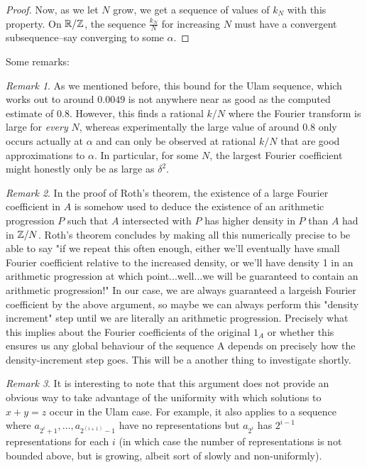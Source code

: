 \documentclass{article}
\theoremstyle{definition}
\theoremstyle{remark}
\newtheorem{remark}{Remark}
\numberwithin{equation}{section}
\begin{document}
\begin{proof}
Now, as we let $N$ grow, we get a sequence of values of $k_N$ with
this property.  On $\mathbb{R}/\mathbb{Z}$, the sequence $\frac{k_N}{N}$ for
increasing $N$ must have a convergent subsequence--say converging to
some $\alpha$.  
\end{proof}

Some remarks: 

\begin{remark}
  As we mentioned before, this bound for the Ulam sequence, which
  works out to around $0.0049$ is not anywhere near as good as the
  computed estimate of $0.8$.  However, this finds a rational $k/N$
  where the Fourier transform is large for \textit{every} $N$, whereas
  experimentally the large value of around $0.8$ only occurs actually
  at $\alpha$ and can only be observed at rational $k/N$ that are good
  approximations to $\alpha$.  In particular, for some $N$, the
  largest Fourier coefficient might honestly only be as large as
  $\delta^2$.
\end{remark}

\begin{remark}
  In the proof of Roth's theorem, the existence of a large Fourier
  coefficient in $A$ is somehow used to deduce the existence of an
  arithmetic progression $P$ such that $A$ intersected with $P$ has
  higher density in $P$ than $A$ had in $\mathbb{Z}/N$.  Roth's theorem
  concludes by making all this numerically precise to be able to say
  "if we repeat this often enough, either we'll eventually have small
  Fourier coefficient relative to the increased density, or we'll have
  density 1 in an arithmetic progression at which point...well...we
  will be guaranteed to contain an arithmetic progression!"  In our
  case, we are always guaranteed a largeish Fourier coefficient by the
  above argument, so maybe we can always perform this "density
  increment" step until we are literally an arithmetic progression.
  Precisely what this implies about the Fourier coefficients of the
  original $1_A$ or whether this ensures us any global behaviour of
  the sequence A depends on precisely how the density-increment step
  goes.  This will be a another thing to investigate shortly.
\end{remark}

\begin{remark}
  It is interesting to note that this argument does not provide an
  obvious way to take advantage of the uniformity with which solutions
  to $x+y=z$ occur in the Ulam case.  For example, it also applies to
  a sequence where $a_{2^i+1}, \ldots, a_{2^(i+1)-1}$ have no
  representations but $a_{2^i}$ has $2^{i-1}$ representations for each
  $i$ (in which case the number of representations is not bounded
  above, but is growing, albeit sort of slowly and non-uniformly).
\end{remark}
\end{document}
